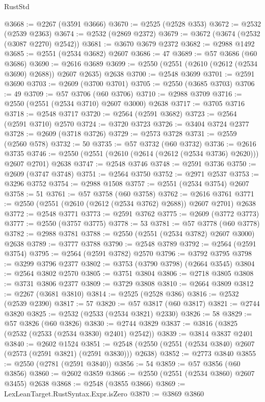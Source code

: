 \begin{lexlean}{RustStd}
\begin{coremodule}
@3668 := @2267 (@3591 @3666)
@3670 := @2525 (@2528 @353)
@3672 := @2532 (@2539 @2363)
@3674 := @2532 (@2869 @2372)
@3679 := @3672 (@3674 (@2532 (@3087 @2270) @2542))
@3681 := @3670 @3679 @2372
@3682 := @2988 @1492
@3685 := @2551 (@2534 @3682) @2607
@3686 := 47
@3689 := @57 @3686 (@60 @3686)
@3690 := @2616 @3689
@3699 := @2550 (@2551 (@2610 (@2612 (@2534 @3690) @2688)) @2607 @2635) @2638
@3700 := @2548 @3699
@3701 := @2591 @3690
@3703 := @2609 (@3700 @3701)
@3705 := @2550 (@3685 @3703)
@3706 := 49
@3709 := @57 @3706 (@60 @3706)
@3710 := @2988 @3709
@3716 := @2550 (@2551 (@2534 @3710) @2607 @3000) @2638
@3717 := @3705 @3716
@3718 := @2548 @3717
@3720 := @2564 (@2591 @3682)
@3723 := @2564 (@2591 @3710) @2570
@3724 := @3720 @3723
@3726 := @3404 @3724 @2377
@3728 := @2609 (@3718 @3726)
@3729 := @2573 @3728
@3731 := @2559 (@2560 @578)
@3732 := 50
@3735 := @57 @3732 (@60 @3732)
@3736 := @2616 @3735
@3746 := @2550 (@2551 (@2610 (@2614 (@2612 (@2534 @3736) @2620))) @2607 @2701) @2638
@3747 := @2548 @3746
@3748 := @2591 @3736
@3750 := @2609 (@3747 @3748)
@3751 := @2564 @3750
@3752 := @2971 @2537
@3753 := @3296 @3752
@3754 := @2988 @1508
@3757 := @2551 (@2534 @3754) @2607
@3758 := 51
@3761 := @57 @3758 (@60 @3758)
@3762 := @2616 @3761
@3771 := @2550 (@2551 (@2610 (@2612 (@2534 @3762) @2688)) @2607 @2701) @2638
@3772 := @2548 @3771
@3773 := @2591 @3762
@3775 := @2609 (@3772 @3773)
@3777 := @2550 (@3757 @3775)
@3778 := 53
@3781 := @57 @3778 (@60 @3778)
@3782 := @2988 @3781
@3788 := @2550 (@2551 (@2534 @3782) @2607 @3000) @2638
@3789 := @3777 @3788
@3790 := @2548 @3789
@3792 := @2564 (@2591 @3754)
@3795 := @2564 (@2591 @3782) @2570
@3796 := @3792 @3795
@3798 := @3299 @3796 @2377
@3802 := @3753 (@3790 @3798) (@2664 @3545)
@3804 := @2564 @3802 @2570
@3805 := @3751 @3804
@3806 := @2718 @3805
@3808 := @3731 @3806 @2377
@3809 := @3729 @3808
@3810 := @2664 @3809
@3812 := @2267 (@3681 @3810)
@3814 := @2525 (@2528 @386)
@3816 := @2532 (@2539 @2390)
@3817 := 57
@3820 := @57 @3817 (@60 @3817)
@3821 := @2744 @3820
@3825 := @2532 (@2533 (@2534 @3821) @2330)
@3826 := 58
@3829 := @57 @3826 (@60 @3826)
@3830 := @2744 @3829
@3837 := @3816 (@3825 (@2532 (@2533 (@2534 @3830) @2401) @2542))
@3839 := @3814 @3837 @2401
@3840 := @2602 @1524
@3851 := @2548 (@2550 (@2551 (@2534 @3840) @2607 (@2573 (@2591 @3821) (@2591 @3830))) @2638)
@3852 := @2773 @3840
@3855 := @2550 (@2781 (@2591 @3840))
@3856 := 54
@3859 := @57 @3856 (@60 @3856)
@3860 := @2602 @3859
@3866 := @2550 (@2551 (@2534 @3860) @2607 @3455) @2638
@3868 := @2548 (@3855 @3866)
@3869 := LexLeanTarget.RustSyntax.Expr.isZero
@3870 := @3869 @3860

\end{coremodule}
\end{lexlean}
